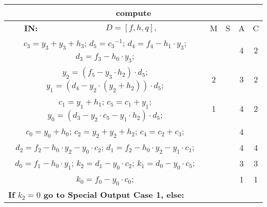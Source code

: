 \begin{tabular}{|c|cr|c|c|c|c|}
\hline
\multicolumn{7}{|c|}{\bf{compute}} \TS \\
\hline
\bf{IN:} &\multicolumn{2}{|c|}{$D = [f,h,q], $}
\TS & M & \hspace{1pt}S\hspace{1pt} & A & \hspace{1pt}C\hspace{1pt} \\
\hline
\multicolumn{3}{|R{340pt}|}{ 
$c_3=y_3+y_3+h_3$;\hspace{4pt}
$d_5=c_3{}^{-1}$;\hspace{4pt}
$d_4=f_4-h_1 \cdot y_3$;\hspace{4pt}
$d_3=f_3-h_0 \cdot y_3$;\hspace{4pt}
} &  &  & 4 & 2\\
\multicolumn{3}{|R{340pt}|}{ 
$y_2=(f_5-y_3 \cdot h_2) \cdot d_5$;\hspace{4pt}
$y_1=(d_4-y_2 \cdot (y_2+h_2)) \cdot d_5$;\hspace{4pt}
} & 2 &  & 3 & 2\\
\multicolumn{3}{|R{340pt}|}{ 
$c_1=y_1+h_1$;\hspace{4pt}
$c_5=c_1+y_1$;\hspace{4pt}
$y_0=(d_3-y_2 \cdot c_5-y_1 \cdot h_2) \cdot d_5$;\hspace{4pt}
} & 1 &  & 4 & 2\\
\multicolumn{3}{|R{340pt}|}{ 
$c_0=y_0+h_0$;\hspace{4pt}
$c_2=y_2+y_2+h_2$;\hspace{4pt}
$c_4=c_2+c_3$;\hspace{4pt}
} &  &  & 4 & \\
\multicolumn{3}{|R{340pt}|}{ 
$d_2=f_2-h_0 \cdot y_2-y_0 \cdot c_2$;\hspace{4pt}
$d_1=f_2-h_0 \cdot y_2-y_1 \cdot c_1$;\hspace{4pt}
} &  &  & 4 & 4\\
\multicolumn{3}{|R{340pt}|}{ 
$d_0=f_1-h_0 \cdot y_1$;\hspace{4pt}
$k_2=d_1-y_0 \cdot c_2$;\hspace{4pt}
$k_1=d_0-y_0 \cdot c_5$;\hspace{4pt}
} &  &  & 3 & 3\\
\multicolumn{3}{|R{340pt}|}{ 
$k_0=f_0-y_0 \cdot c_0$;\hspace{4pt}
} &  &  & 1 & 1\\
\multicolumn{3}{|l|}{ 
 \bf{If $k_2 = 0$ go to Special Output Case 1, else:} } &  &  &  & \\

\end{tabular}
